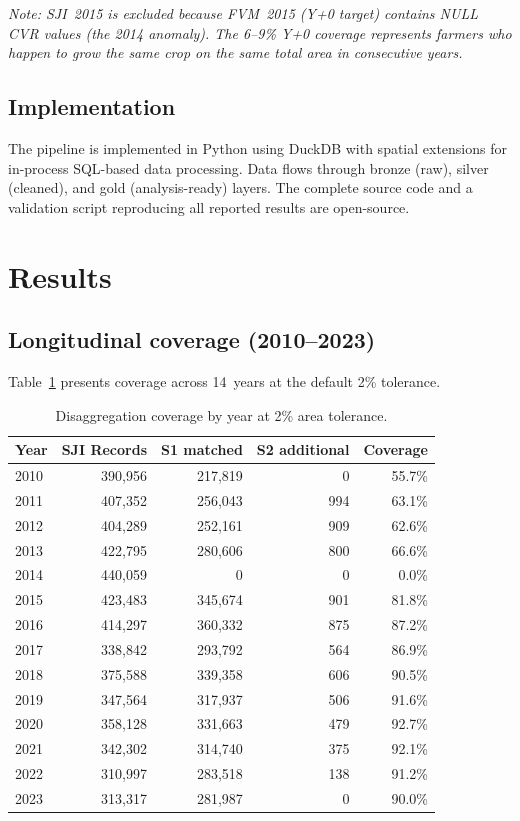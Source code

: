 \documentclass[12pt,a4paper]{article}
\begin{document}
\noindent\textit{Note: SJI~2015 is excluded because FVM~2015 (Y+0 target) contains NULL CVR values (the 2014 anomaly). The 6--9\% Y+0 coverage represents farmers who happen to grow the same crop on the same total area in consecutive years.}

\subsection{Implementation}

The pipeline is implemented in Python using DuckDB with spatial extensions for in-process SQL-based data processing. Data flows through bronze (raw), silver (cleaned), and gold (analysis-ready) layers. The complete source code and a validation script reproducing all reported results are open-source.

\section{Results}

\subsection{Longitudinal coverage (2010--2023)}

Table~\ref{tab:coverage} presents coverage across 14~years at the default 2\% tolerance.

\begin{table}[H]
\centering
\caption{Disaggregation coverage by year at 2\% area tolerance.}
\label{tab:coverage}
\begin{tabular}{@{}lrrrr@{}}
\toprule
Year & SJI Records & S1 matched & S2 additional & Coverage \\
\midrule
2010 & 390,956 & 217,819 & 0 & 55.7\% \\
2011 & 407,352 & 256,043 & 994 & 63.1\% \\
2012 & 404,289 & 252,161 & 909 & 62.6\% \\
2013 & 422,795 & 280,606 & 800 & 66.6\% \\
2014 & 440,059 & 0 & 0 & 0.0\% \\
2015 & 423,483 & 345,674 & 901 & 81.8\% \\
2016 & 414,297 & 360,332 & 875 & 87.2\% \\
2017 & 338,842 & 293,792 & 564 & 86.9\% \\
2018 & 375,588 & 339,358 & 606 & 90.5\% \\
2019 & 347,564 & 317,937 & 506 & 91.6\% \\
2020 & 358,128 & 331,663 & 479 & 92.7\% \\
2021 & 342,302 & 314,740 & 375 & 92.1\% \\
2022 & 310,997 & 283,518 & 138 & 91.2\% \\
2023 & 313,317 & 281,987 & 0 & 90.0\% \\
\bottomrule
\end{tabular}
\end{table}
\end{document}
